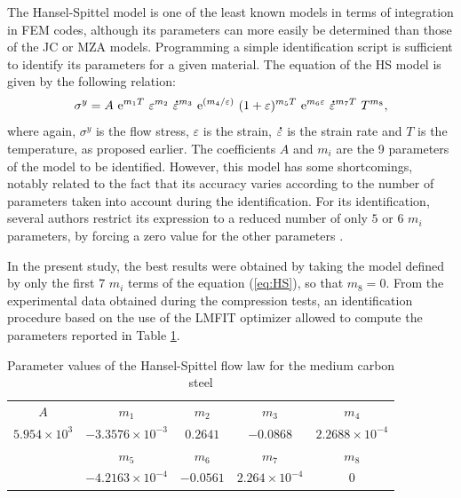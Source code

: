 \documentclass[twoside,english,1p,final,sort&compress]{elsarticle}
\theoremstyle{plain}
\DeclareRobustCommand{\e}[1]{{\rm e}^{#1}}
\DeclareRobustCommand{\mdot}[1]{\accentset{\mbox{\bfseries .}}{#1}}
\begin{document}
The Hansel-Spittel model \cite{Hensel-1978} is one of the least known models in terms of integration in FEM codes, although its parameters can more easily be determined than those of the JC or MZA models.
Programming a simple identification script is sufficient to identify its parameters for a given material.
The equation of the HS model is given by the following relation:
\begin{equation}
\sigma^y = A~\e{m_1T}~\varepsilon^{m_2}~\mdot\varepsilon^{m_3}~\e{({m_4}/{\varepsilon})}~(1+\varepsilon)^{m_5T}~\e{m_6\varepsilon}~\mdot\varepsilon^{m_7T}~T^{m_8}, \label{eq:HS}
\end{equation}
where again, $\sigma^y$ is the flow stress, $\varepsilon$ is the strain, $\mdot\varepsilon$ is the strain rate and $T$ is the temperature, as proposed earlier.
The coefficients $A$ and $m_i$ are the 9 parameters of the model to be identified.
However, this model has some shortcomings, notably related to the fact that its accuracy varies according to the number of parameters taken into account during the identification.
For its identification, several authors restrict its expression to a reduced number of only $5$ or $6$ $m_i$ parameters, by forcing a zero value for the other parameters \cite{Chadha-2018, Mehtedi-2015, Rudnytskyj-2020}.

In the present study, the best results were obtained by taking the model defined by only the first 7 $m_i$ terms of the equation (\ref{eq:HS}), so that $m_8=0$.
From the experimental data obtained during the compression tests, an identification procedure based on the use of the LMFIT optimizer \cite{Newville-2016} allowed to compute the parameters reported in Table
 \ref{tab:HS}.

\begin{table}[h!]
\centering
\caption{Parameter values of the Hansel-Spittel flow law for the medium carbon steel}
\begin{tabular}{ccccc}
	\hline
	        $A$          &         $m_1$          &   $m_2$   &        $m_3$         &         $m_4$         \\
	$5.954\times 10^{3}$ & $-3.3576\times10^{-3}$ & $0.2641$  &      $-0.0868$       & $2.2688\times10^{-4}$ \\ \hline
	                     &         $m_5$          &   $m_6$   &        $m_7$         &         $m_8$         \\
	                     & $-4.2163\times10^{-4}$ & $-0.0561$ & $2.264\times10^{-4}$ &          $0$          \\ \hline
\end{tabular}
\label{tab:HS}
\end{table}
\end{document}

